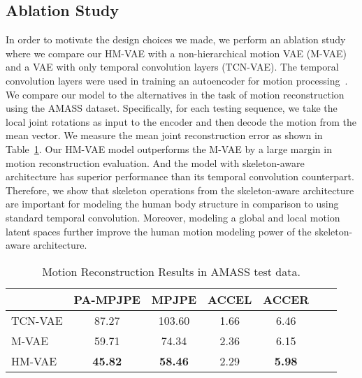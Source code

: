 \subsection{Ablation Study}
\vspace{-2mm}
In order to motivate the design choices we made, we perform an ablation study where we compare our HM-VAE with a non-hierarchical motion VAE (M-VAE) and a VAE with only temporal convolution layers (TCN-VAE). The temporal convolution layers were used in training an autoencoder for motion processing~\cite{holden2015learning,holden2016deep}.
We compare our model to the alternatives in the task of motion reconstruction using the AMASS dataset. 
Specifically, for each testing sequence, we take the local joint rotations as input to the encoder and then decode the motion from the mean vector.
We measure the mean joint reconstruction error as shown in Table~\ref{table:motion_rec}.
Our HM-VAE model outperforms the M-VAE by a large margin in motion reconstruction evaluation.
And the model with skeleton-aware architecture has superior performance than its temporal convolution counterpart.
Therefore, we show that skeleton operations from the skeleton-aware architecture are important for modeling the human body structure in comparison to using standard temporal convolution.
Moreover, modeling a global and local motion latent spaces further improve the human motion modeling power of the skeleton-aware architecture. 
\\

\begin{table}[t!]
\small
\begin{center}
\footnotesize{
\setlength{\tabcolsep}{8pt}
\begin{tabular}{@{}l||cccccc@{}} 
\hline
 & PA-MPJPE  & MPJPE & ACCEL & ACCER \\ \hline\hline
TCN-VAE & 87.27 & 103.60 & 1.66 & 6.46 \\ \hline 
M-VAE & 59.71 & 74.34 & 2.36 & 6.15 \\ \hline
HM-VAE & \textbf{45.82} & \textbf{58.46} & 2.29 & \textbf{5.98} \\ \hline
\end{tabular}
}
\end{center}
\vspace{-5mm}
\caption{\small Motion Reconstruction Results in AMASS test data.}
\label{table:motion_rec}
\vspace{-6mm}
\end{table}


























